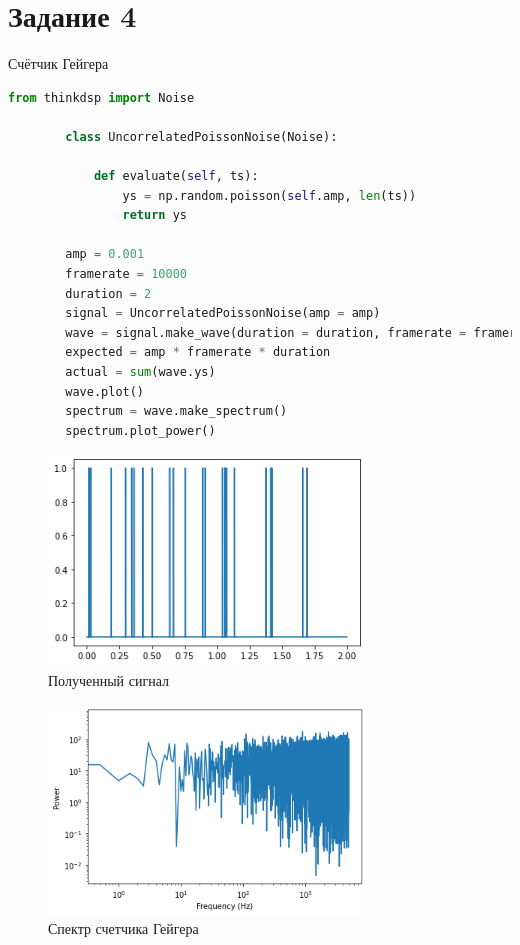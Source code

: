 \documentclass[a4paper, 12pt]{report}
\begin{document}
	\section{Задание 4}
	Счётчик Гейгера
	\begin{lstlisting}[language=Python,caption=Реализация счётчика Гейгера]
		from thinkdsp import Noise

		class UncorrelatedPoissonNoise(Noise):

			def evaluate(self, ts):
				ys = np.random.poisson(self.amp, len(ts))
				return ys

		amp = 0.001
		framerate = 10000
		duration = 2
		signal = UncorrelatedPoissonNoise(amp = amp)
		wave = signal.make_wave(duration = duration, framerate = framerate)
		expected = amp * framerate * duration
		actual = sum(wave.ys)
		wave.plot()
		spectrum = wave.make_spectrum()
		spectrum.plot_power()
	\end{lstlisting}
	\begin{figure}[H]
		\centering
		\includegraphics[width=0.75\textwidth]{result3.png}
		\caption{Полученный сигнал}
		\label{fig:result3}
	\end{figure}
	\begin{figure}[H]
		\centering
		\includegraphics[width=0.75\textwidth]{result4.png}
		\caption{Спектр счетчика Гейгера}
		\label{fig:result4}
	\end{figure}
\end{document}
